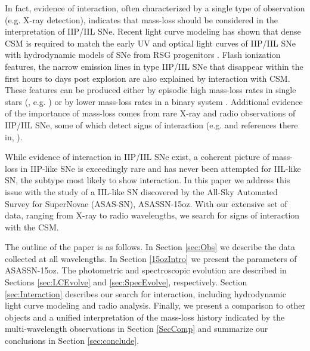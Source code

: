 \documentclass[a4paper,fleqn,usenatbib]{mnras}
\begin{document}
In fact, evidence of interaction, often characterized by a single type of observation (e.g. X-ray detection), indicates that mass-loss should be considered in the interpretation of IIP/IIL SNe.
Recent light curve modeling has shown that dense CSM is required to match the early UV and optical light curves of IIP/IIL SNe with hydrodynamic models of SNe from RSG progenitors \citep{2015gezari,2018morozova,2018paxton,2018foerster}.  
Flash ionization features, the narrow emission lines in type IIP/IIL SNe that disappear within the first hours to days post explosion are also explained by interaction with CSM. 
These features can be produced either by episodic high mass-loss rates in single stars (\citealt{2014gal-yam}, e.g. \citealt{ 2017yaron}) or by lower mass-loss rates in a binary system \citep{2018kochanek}.
Additional evidence of the importance of mass-loss comes from rare X-ray and radio observations of IIP/IIL SNe, some of which detect signs of interaction (e.g. \citealt{2014dwarkadas} and references there in, \citealt{2018morozova2}).

While evidence of interaction in IIP/IIL SNe exist, a coherent picture of mass-loss in IIP-like SNe is exceedingly rare and has never been attempted for IIL-like SN, the subtype most likely to show interaction.
In this paper we address this issue with the study of a IIL-like SN discovered by the All-Sky Automated Survey for SuperNovae (ASAS-SN), ASASSN-15oz.
With our extensive set of data, ranging from X-ray to radio wavelengths, we search for signs of interaction with the CSM.

The outline of the paper is as follows.
In Section \ref{sec:Obs} we describe the data collected at all wavelengths.
In Section \ref{15ozIntro} we present the parameters of ASASSN-15oz.
The photometric and spectroscopic evolution are described in Sections \ref{sec:LCEvolve} and \ref{sec:SpecEvolve}, respectively.
Section \ref{sec:Interaction} describes our search for interaction, including hydrodynamic light curve modeling and radio analysis.
Finally, we present a comparison to other objects and a unified interpretation of the mass-loss history indicated by the multi-wavelength observations  in Section \ref{SecComp} and summarize our conclusions in Section \ref{sec:conclude}.
\end{document}
